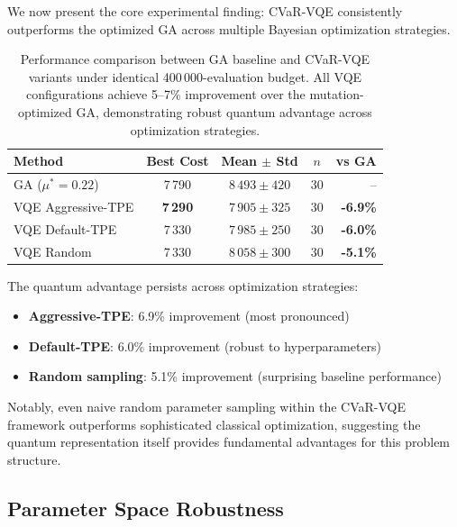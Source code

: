We now present the core experimental finding: CVaR-VQE consistently outperforms the optimized GA across multiple Bayesian optimization strategies.


\begin{table}[htb]
    \centering
    \caption{Performance comparison between GA baseline and CVaR-VQE variants under identical 400\,000-evaluation budget. All VQE configurations achieve 5--7\% improvement over the mutation-optimized GA, demonstrating robust quantum advantage across optimization strategies.}
    \label{tab:main_results}
    \begin{tabular}{lcccr}
        \toprule
        Method & Best Cost & Mean $\pm$ Std & $n$ & vs GA \\
        \midrule
        GA ($\mu^* = 0.22$) & 7\,790 & $8\,493 \pm 420$ & 30 & -- \\
        VQE Aggressive-TPE & \textbf{7\,290} & $7\,905 \pm 325$ & 30 & \textbf{-6.9\%} \\
        VQE Default-TPE & 7\,330 & $7\,985 \pm 250$ & 30 & \textbf{-6.0\%} \\
        VQE Random & 7\,330 & $8\,058 \pm 300$ & 30 & \textbf{-5.1\%} \\
        \bottomrule
    \end{tabular}
\end{table}

The quantum advantage persists across optimization strategies:
\begin{itemize}[nosep]
    \item \textbf{Aggressive-TPE}: 6.9\% improvement (most pronounced)
    \item \textbf{Default-TPE}: 6.0\% improvement (robust to hyperparameters)  
    \item \textbf{Random sampling}: 5.1\% improvement (surprising baseline performance)
\end{itemize}

Notably, even naive random parameter sampling within the CVaR-VQE framework outperforms sophisticated classical optimization, suggesting the quantum representation itself provides fundamental advantages for this problem structure.

\subsection{Parameter Space Robustness}

